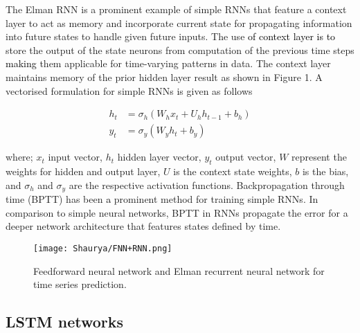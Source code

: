 \documentclass{ieeeaccess}
\begin{document}
  The Elman RNN \cite{Elman_1990} is a prominent example of simple RNNs that  feature  a  context layer to act as memory  and incorporate current state for propagating information into future states to handle given future inputs. The   use \textcolor{black}{of context layer is to} store the output of the state neurons from computation of the previous time steps \textcolor{black}{making} them applicable for time-varying patterns in  data.  The context layer   maintains memory of the prior hidden layer result as shown in Figure 1. A vectorised formulation for simple RNNs is given as follows
 
  \begin{equation} 
  \begin{aligned} 
  h_t &= \sigma_h(W_{h} x_t + U_{h} h_{t-1} + b_h) \\
y_t &= \sigma_y(W_{y} h_t + b_y)
  \end{aligned}
 \end{equation}
 
 
 
 \noindent  where; $x_{t}$ input vector, $h_{t}$ hidden layer vector, $y_{t}$ output vector, $W$ represent the weights for hidden  and output layer,  $U$ is the context state weights,   $b$  is the bias,  and $\sigma _{h}$   and   $\sigma_y$ are the respective activation functions. Backpropagation through time (BPTT) \cite{Werbos_1990} has been \textcolor{black}{a} prominent method for training simple RNNs. In comparison to simple neural networks, BPTT in RNNs propagate the error for a deeper network architecture that features states defined by time.  
  
 

 \begin{figure*}[tb]
  \begin{center}  
   \texttt{[image: Shaurya/FNN+RNN.png]} \\
   
   \label{fig:FNNRNN}
    \caption{ Feedforward neural network and Elman recurrent neural network for time series prediction. }
\end{center}
\end{figure*}


 \subsection{LSTM  networks}
 
\end{document}

